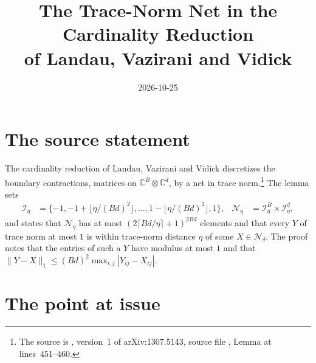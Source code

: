 \documentclass{article}
\title{The Trace-Norm Net in the Cardinality Reduction\\
    of Landau, Vazirani and Vidick}
\author{}
\date{2026-10-25}
\begin{document}
\maketitle
{}

\section{The source statement}

The cardinality reduction of Landau, Vazirani and Vidick discretizes the
boundary contractions, matrices on $\mathbb C^B\otimes\mathbb C^d$, by a net
in trace norm.\footnote{The source is \cite{Landau2013PolynomialTime},
    version~1 of arXiv:1307.5143, source file , Lemma
     at lines~451--460.} The lemma sets
\begin{align}
    \mathcal I_\eta
     & =\{-1,-1+\lfloor\eta/(Bd)^2\rfloor,\dots,1-\lfloor\eta/(Bd)^2\rfloor,1\},
     &
    \mathcal N_\eta
     & =\mathcal I_\eta^{B}\times\mathcal I_\eta^{d},
    \label{eq:lvv13_trace_norm_net_printed}
\end{align}
and states that $\mathcal N_\eta$ has at most
$(2\lceil Bd/\eta\rceil+1)^{2Bd}$ elements and that every $Y$ of trace norm
at most $1$ is within trace-norm distance $\eta$ of some $X\in\mathcal
    N_\delta$. The proof notes that the entries of such a $Y$ have modulus at
most $1$ and that $\|Y-X\|_1\le(Bd)^2\max_{i,j}|Y_{ij}-X_{ij}|$.

\section{The point at issue}
\end{document}

